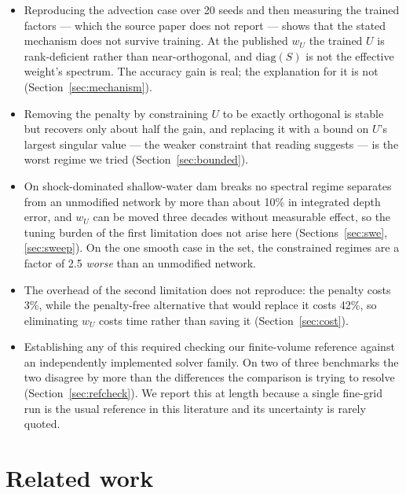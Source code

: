 \documentclass[11pt]{article}
\newcommand{\wU}{w_U}
\begin{document}
\begin{itemize}
  \item Reproducing the advection case over 20 seeds and then measuring the
    trained factors --- which the source paper does not report --- shows that
    the stated mechanism does not survive training. At the published $\wU$ the
    trained $U$ is rank-deficient rather than near-orthogonal, and
    $\mathrm{diag}(S)$ is not the effective weight's spectrum. The accuracy
    gain is real; the explanation for it is not
    (Section~\ref{sec:mechanism}).
  \item Removing the penalty by constraining $U$ to be exactly orthogonal is
    stable but recovers only about half the gain, and replacing it with a
    bound on $U$'s largest singular value --- the weaker constraint that
    reading suggests --- is the worst regime we tried
    (Section~\ref{sec:bounded}).
  \item On shock-dominated shallow-water dam breaks no spectral regime
    separates from an unmodified network by more than about 10\% in integrated
    depth error, and $\wU$ can be moved three decades without measurable
    effect, so the tuning burden of the first limitation does not arise here
    (Sections~\ref{sec:swe}, \ref{sec:sweep}). On the one smooth case in the
    set, the constrained regimes are a factor of 2.5 \emph{worse} than an
    unmodified network.
  \item The overhead of the second limitation does not reproduce: the penalty
    costs 3\%, while the penalty-free alternative that would replace it costs
    42\%, so eliminating $\wU$ costs time rather than saving it
    (Section~\ref{sec:cost}).
  \item Establishing any of this required checking our finite-volume reference
    against an independently implemented solver family. On two of three
    benchmarks the two disagree by more than the differences the comparison is
    trying to resolve (Section~\ref{sec:refcheck}). We report this at length
    because a single fine-grid run is the usual reference in this literature
    and its uncertainty is rarely quoted.
\end{itemize}

\section{Related work}
\label{sec:related}
\end{document}
